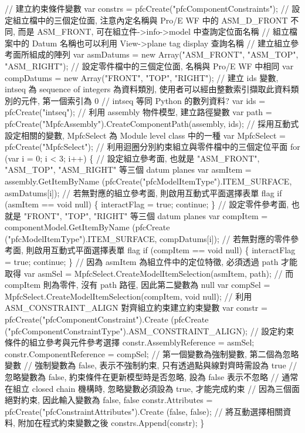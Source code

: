 \documentclass[]{article}
\newenvironment{Shaded}{}{}
\newcommand{\StringTok}[1]{\textcolor[rgb]{0.25,0.44,0.63}{{#1}}}
\begin{document}
\begin{Shaded}
\begin{Highlighting}[]
\StringTok{// 建立約束條件變數}
\StringTok{var constrs = pfcCreate("pfcComponentConstraints");}
\StringTok{// 設定組立檔中的三個定位面, 注意內定名稱與 Pro/E WF 中的 ASM_D_FRONT 不同, 而是 ASM_FRONT, 可在組立件->info->model 中查詢定位面名稱}
\StringTok{// 組立檔案中的 Datum 名稱也可以利用 View->plane tag display 查詢名稱}
\StringTok{// 建立組立參考面所組成的陣列}
\StringTok{var asmDatums = new Array("ASM_FRONT", "ASM_TOP", "ASM_RIGHT");}
\StringTok{// 設定零件檔中的三個定位面, 名稱與 Pro/E WF 中相同}
\StringTok{var compDatums = new Array("FRONT", "TOP", "RIGHT");}
\StringTok{// 建立 ids 變數, intseq 為 sequence of integers 為資料類別, 使用者可以經由整數索引擷取此資料類別的元件, 第一個索引為 0}
\StringTok{       // intseq 等同 Python 的數列資料?}
\StringTok{var ids = pfcCreate("intseq");}
\StringTok{// 利用 assembly 物件模型, 建立路徑變數}
\StringTok{var path = pfcCreate("MpfcAssembly").CreateComponentPath(assembly, ids);}
\StringTok{// 採用互動式設定相關的變數, MpfcSelect 為 Module level class 中的一種}
\StringTok{var MpfcSelect = pfcCreate("MpfcSelect");}
\StringTok{// 利用迴圈分別約束組立與零件檔中的三個定位平面}
\StringTok{for (var i = 0; i < 3; i++)}
\StringTok{\{}
\StringTok{// 設定組立參考面, 也就是 "ASM_FRONT", "ASM_TOP", "ASM_RIGHT" 等三個 datum planes}
\StringTok{var asmItem = assembly.GetItemByName (pfcCreate("pfcModelItemType").ITEM_SURFACE, asmDatums[i]);}
\StringTok{// 若無對應的組立參考面, 則啟用互動式平面選擇表單 flag}
\StringTok{if (asmItem == void null)}
\StringTok{\{}
\StringTok{    interactFlag = true;}
\StringTok{    continue;}
\StringTok{\}}
\StringTok{// 設定零件參考面, 也就是 "FRONT", "TOP", "RIGHT" 等三個 datum planes}
\StringTok{var compItem = componentModel.GetItemByName (pfcCreate ("pfcModelItemType").ITEM_SURFACE, compDatums[i]);}
\StringTok{// 若無對應的零件參考面, 則啟用互動式平面選擇表單 flag}
\StringTok{if (compItem == void null)}
\StringTok{\{}
\StringTok{    interactFlag = true;}
\StringTok{    continue;}
\StringTok{\}}
\StringTok{        // 因為 asmItem 為組立件中的定位特徵, 必須透過 path 才能取得}
\StringTok{var asmSel = MpfcSelect.CreateModelItemSelection(asmItem, path);}
\StringTok{        // 而 compItem 則為零件, 沒有 path 路徑, 因此第二變數為 null}
\StringTok{var compSel = MpfcSelect.CreateModelItemSelection(compItem, void null);}
\StringTok{        // 利用 ASM_CONSTRAINT_ALIGN 對齊組立約束建立約束變數}
\StringTok{var constr = pfcCreate("pfcComponentConstraint").Create (pfcCreate ("pfcComponentConstraintType").ASM_CONSTRAINT_ALIGN);}
\StringTok{        // 設定約束條件的組立參考與元件參考選擇}
\StringTok{constr.AssemblyReference = asmSel;}
\StringTok{constr.ComponentReference = compSel;}
\StringTok{       // 第一個變數為強制變數, 第二個為忽略變數}
\StringTok{       // 強制變數為 false, 表示不強制約束, 只有透過點與線對齊時需設為 true}
\StringTok{       // 忽略變數為 false, 約束條件在更新模型時是否忽略, 設為 false 表示不忽略}
\StringTok{       // 通常在組立 closed chain 機構時,  忽略變數必須設為 true, 才能完成約束}
\StringTok{       // 因為三個面絕對約束, 因此輸入變數為 false, false}
\StringTok{constr.Attributes = pfcCreate("pfcConstraintAttributes").Create (false, false);}
\StringTok{// 將互動選擇相關資料, 附加在程式約束變數之後}
\StringTok{constrs.Append(constr);}
\StringTok{\}}


\end{Highlighting}
\end{Shaded}
\end{document}
